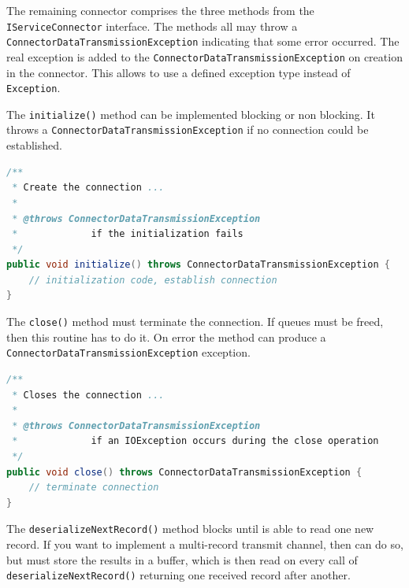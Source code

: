 \documentclass[11pt,a4paper]{article}
\begin{document}
\noindent The remaining connector comprises the three methods from the \texttt{IServiceConnector} interface. The methods all may throw a \texttt{ConnectorDataTransmissionException} indicating that some error occurred. The real exception is added to the \texttt{ConnectorDataTransmissionException} on creation in the connector. This allows to use a defined exception type instead of \texttt{Exception}.

The \texttt{initialize()} method can be implemented blocking or non blocking. It throws a \texttt{ConnectorDataTransmissionException} if no connection could be established. 

\begin{lstlisting}[language=Java,caption=Initialization method]
/**
 * Create the connection ...
 * 
 * @throws ConnectorDataTransmissionException
 *             if the initialization fails
 */
public void initialize() throws ConnectorDataTransmissionException {
	// initialization code, establish connection
}
\end{lstlisting}

\noindent The \texttt{close()} method must terminate the connection. If queues must be freed, then this routine has to do it. On error the method can produce a \texttt{ConnectorDataTransmissionException} exception.

\begin{lstlisting}[language=Java,caption=Close method]
/**
 * Closes the connection ...
 * 
 * @throws ConnectorDataTransmissionException
 *             if an IOException occurs during the close operation
 */
public void close() throws ConnectorDataTransmissionException {
	// terminate connection
}
\end{lstlisting}

\noindent The \texttt{deserializeNextRecord()} method blocks until is able to read one new record. If you want to implement a multi-record transmit channel, then can do so, but must store the results in a buffer, which is then read on every call of \texttt{deserializeNextRecord()} returning one received record after another.
\end{document}
